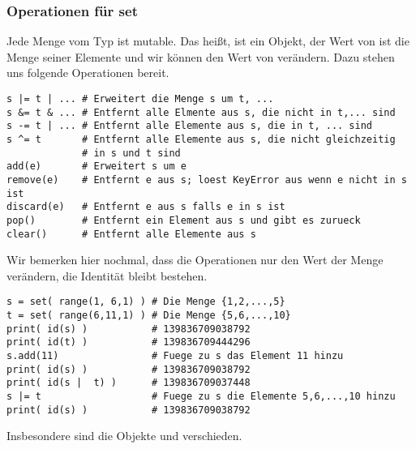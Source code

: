\subsubsection{Operationen für set}
\label{section:std_data_types:mengen:operationen_fuer_set}
Jede Menge  vom Typ  ist mutable.
Das heißt,  ist ein Objekt, der Wert von  ist die Menge seiner Elemente und wir können den Wert von  verändern.
Dazu stehen uns folgende Operationen bereit.
\begin{lstlisting}
s |= t | ... # Erweitert die Menge s um t, ...
s &= t & ... # Entfernt alle Elmente aus s, die nicht in t,... sind
s -= t | ... # Entfernt alle Elemente aus s, die in t, ... sind
s ^= t       # Entfernt alle Elemente aus s, die nicht gleichzeitig
             # in s und t sind
add(e)       # Erweitert s um e
remove(e)    # Entfernt e aus s; loest KeyError aus wenn e nicht in s ist
discard(e)   # Entfernt e aus s falls e in s ist
pop()        # Entfernt ein Element aus s und gibt es zurueck
clear()      # Entfernt alle Elemente aus s
\end{lstlisting}

Wir bemerken hier nochmal, dass die Operationen nur den Wert der Menge  ver\-än\-dern, die Identität  bleibt bestehen.
\begin{lstlisting}
s = set( range(1, 6,1) ) # Die Menge {1,2,...,5}
t = set( range(6,11,1) ) # Die Menge {5,6,...,10}
print( id(s) )           # 139836709038792
print( id(t) )           # 139836709444296
s.add(11)                # Fuege zu s das Element 11 hinzu
print( id(s) )           # 139836709038792
print( id(s |  t) )      # 139836709037448
s |= t                   # Fuege zu s die Elemente 5,6,...,10 hinzu
print( id(s) )           # 139836709038792
\end{lstlisting}
Insbesondere sind die Objekte  und  verschieden.
